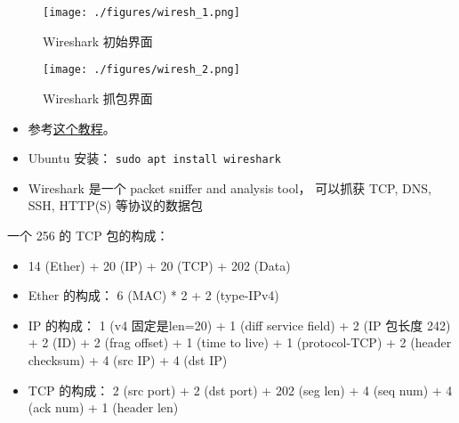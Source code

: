 
\begin{issues}
\issueDraft
\end{issues}

\begin{figure}[ht]
\centering
\texttt{[image: ./figures/wiresh\_1.png]}
\caption{Wireshark 初始界面} \label{wiresh_fig1}
\end{figure}

\begin{figure}[ht]
\centering
\texttt{[image: ./figures/wiresh\_2.png]}
\caption{Wireshark 抓包界面} \label{wiresh_fig2}
\end{figure}


\begin{itemize}
\item 参考\href{https://www.varonis.com/blog/how-to-use-wireshark}{这个教程}。
\item Ubuntu 安装： \verb|sudo apt install wireshark|
\item Wireshark 是一个 packet sniffer and analysis tool， 可以抓获 TCP, DNS, SSH, HTTP(S)   等协议的数据包
\end{itemize}

一个 256 的 TCP 包的构成：
\begin{itemize}
\item 14 (Ether) + 20 (IP) + 20 (TCP) + 202 (Data)
\item Ether 的构成： 6 (MAC) * 2 + 2 (type-IPv4)
\item IP 的构成： 1 (v4 固定是len=20) + 1 (diff service field) + 2 (IP 包长度 242) + 2 (ID) + 2 (frag offset) + 1 (time to live) + 1 (protocol-TCP) + 2 (header checksum) + 4 (src IP) + 4 (dst IP)
\item TCP 的构成： 2 (src port) + 2 (dst port) + 202 (seg len) + 4 (seq num) + 4 (ack num) + 1 (header len) 
\end{itemize}

